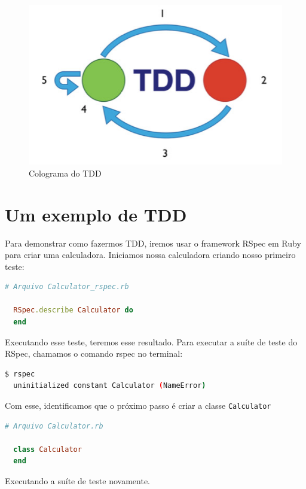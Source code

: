 \documentclass[12pt]{article}
\newcommand{\code}[1]{\texttt{#1}}
\begin{document}
  \begin{figure}[H]
    \centering
    \includegraphics[scale=1.0]{tdd_micro}
    \caption{Colograma do TDD}
  \end{figure}

  \section{Um exemplo de TDD}

  Para demonstrar como fazermos TDD, iremos usar o framework RSpec em Ruby para
  criar uma calculadora. Iniciamos nossa calculadora criando nosso primeiro 
  teste:

  \begin{lstlisting}[language=Ruby]
  # Arquivo Calculator_rspec.rb

  RSpec.describe Calculator do
  end
  \end{lstlisting}

  Executando esse teste, teremos esse resultado. Para executar a suíte de teste
  do RSpec, chamamos o comando rspec no terminal:

  \begin{lstlisting}[language=bash]
  $ rspec
  uninitialized constant Calculator (NameError)
  \end{lstlisting}

  Com esse, identificamos que o próximo passo é criar a classe \code{Calculator}

  \begin{lstlisting}[language=Ruby]
  # Arquivo Calculator.rb

  class Calculator
  end
  \end{lstlisting}

  Executando a suíte de teste novamente.
\end{document}
